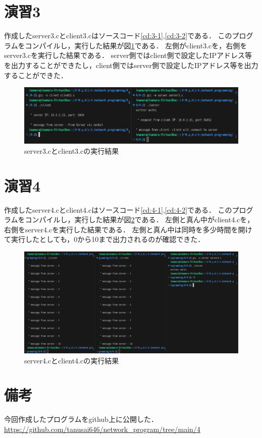 \documentclass[documentclass]{jsarticle}
\begin{document}
\newpage
\section*{演習3}
作成したserver3.cとclient3.cはソースコード\ref*{cd:3-1},\ref*{cd:3-2}である．
このプログラムをコンパイルし，実行した結果が図\ref*{fig:3-1}である．
左側がclient3.cを，右側をserver3.cを実行した結果である．
server側ではclient側で設定したIPアドレス等を出力することができたし，client側ではserver側で設定したIPアドレス等を出力することができた．




\begin{figure}[H]
  \begin{center}
    \includegraphics*[scale=0.7]{figure/3-1.png}
  \end{center}
  \caption{server3.cとclient3.cの実行結果}
  \label{fig:3-1}
\end{figure}

\newpage
\section*{演習4}
作成したserver4.cとclient4.cはソースコード\ref*{cd:4-1},\ref*{cd:4-2}である．
このプログラムをコンパイルし，実行した結果が図\ref*{fig:4-1}である．
左側と真ん中がclient4.cを，右側をserver4.cを実行した結果である．
左側と真ん中は同時を多少時間を開けて実行したとしても，0から10まで出力されるのが確認できた．



\begin{figure}[H]
  \begin{center}
    \includegraphics*[scale=0.55]{figure/4-1.png}
  \end{center}
  \caption{server4.cとclient4.cの実行結果}
  \label{fig:4-1}
\end{figure}


\section*{備考}
今回作成したプログラムをgithub上に公開した．\\
\url{https://github.com/tanusai646/network_program/tree/main/4}
\end{document}
